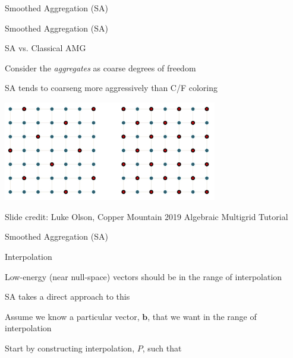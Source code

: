 \documentclass[18pt,xcolor=table]{beamer}
\begin{document}
\begin{frame}{Smoothed Aggregation (SA)}
{\begin{center}
\end{center}
}
\end{frame}

\begin{frame}{Smoothed Aggregation (SA)}
\begin{block}{SA vs. Classical AMG}
\bit
\item Consider the \emph{aggregates} as coarse degrees of freedom
\item SA tends to coarseng more aggressively than C/F coloring
\eit
\end{block}
\begin{center}
\includegraphics[width=0.7\textwidth]{../figures/saCoarsening12}
\end{center}
\tiny{Slide credit: Luke Olson, Copper Mountain 2019 Algebraic Multigrid Tutorial}
\end{frame}

\begin{frame}{Smoothed Aggregation (SA)}
\begin{block}{Interpolation}
\bit
\item Low-energy (near null-space) vectors should be in the range of interpolation
\item SA takes a direct approach to this 
\item Assume we know a particular vector, $\mathbf{b}$, that we want in the range of interpolation
\item Start by constructing interpolation, $P$, such that 
\eit
{}
\end{block}
\end{frame}
\end{document}
